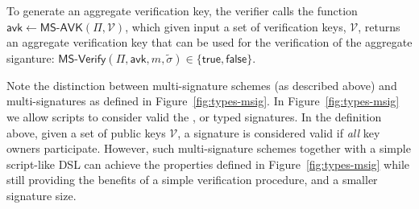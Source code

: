 To generate an aggregate verification key, the verifier calls the function 
$\mathsf{avk}\leftarrow\textsf{MS-AVK}(\Pi, \mathcal{V})$, which given input a 
set of verification keys, $\mathcal{V}$, returns an aggregate verification key 
that can be used for the verification of the aggregate siganture: 
$\textsf{MS-Verify}(\Pi, \mathsf{avk}, m, 
\tilde{\sigma})\in\{\textsf{true},\textsf{false}\}$. 

Note the distinction between multi-signature schemes (as described above) and 
multi-signatures as defined in Figure~\ref{fig:types-msig}. In 
Figure~\ref{fig:types-msig} we allow scripts to consider valid the 
,  or  typed signatures. 
In the definition above, given a set of public keys $\mathcal{V}$, a signature 
is considered valid if \textit{all} key owners participate. However, such 
multi-signature schemes together with a simple script-like DSL can achieve the 
properties defined in Figure~\ref{fig:types-msig} while still providing the 
benefits of a simple verification procedure, and a smaller signature size. 
